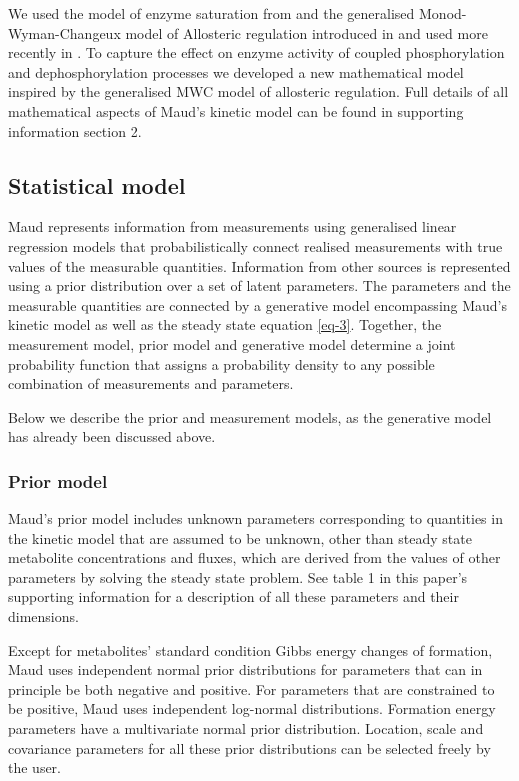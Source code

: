 \documentclass[journal=asbcd6,manuscript=article,layout=traditional]{achemso}
\begin{document}
We used the model of enzyme saturation from
\citet{liebermeister_modular_2010} and the generalised
Monod-Wyman-Changeux model of Allosteric regulation introduced in
\citep{monod_nature_1965, changeux_2013, popova_generalization_1975, popova_description_1979}
and used more recently in \citet{matosGRASPComputationalPlatform2022}.
To capture the effect on enzyme activity of coupled phosphorylation and
dephosphorylation processes we developed a new mathematical model
inspired by the generalised MWC model of allosteric regulation. Full
details of all mathematical aspects of Maud's kinetic model can be found
in supporting information section 2.

\hypertarget{statistical-model}{%
\subsection{Statistical model}\label{statistical-model}}

Maud represents information from measurements using generalised linear
regression models that probabilistically connect realised measurements
with true values of the measurable quantities. Information from other
sources is represented using a prior distribution over a set of latent
parameters. The parameters and the measurable quantities are connected
by a generative model encompassing Maud's kinetic model as well as the
steady state equation \eqref{eq-3}. Together, the measurement model,
prior model and generative model determine a joint probability function
that assigns a probability density to any possible combination of
measurements and parameters.

Below we describe the prior and measurement models, as the generative
model has already been discussed above.

\hypertarget{prior-model}{%
\subsubsection{Prior model}\label{prior-model}}

Maud's prior model includes unknown parameters corresponding to
quantities in the kinetic model that are assumed to be unknown, other
than steady state metabolite concentrations and fluxes, which are
derived from the values of other parameters by solving the steady state
problem. See table 1 in this paper's supporting information for a
description of all these parameters and their dimensions.

Except for metabolites' standard condition Gibbs energy changes of
formation, Maud uses independent normal prior distributions for
parameters that can in principle be both negative and positive. For
parameters that are constrained to be positive, Maud uses independent
log-normal distributions. Formation energy parameters have a
multivariate normal prior distribution. Location, scale and covariance
parameters for all these prior distributions can be selected freely by
the user.
\end{document}
